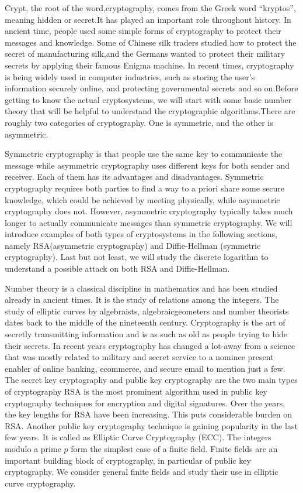\documentclass[a4paper,12pt]{article}
\begin{document}
    Crypt, the root of the word,cryptography, comes from the Greek word “kryptos”, meaning hidden or secret.It has played an important role throughout history. In ancient time, people used some simple forms of cryptography to protect their messages and knowledge. Some of Chinese silk traders studied how to protect the secret of manufacturing silk,and the Germans wanted to protect their military secrets by applying their famous Enigma machine. In recent times, cryptography is being widely used in computer industries, such as storing the user's information securely online, and protecting governmental secrets and so on.Before getting to know the actual cryptosystems, we will start with some basic number theory that will be helpful to understand the cryptographic algorithms.There are roughly two categories of cryptography. One is symmetric, and the other is asymmetric.


    Symmetric cryptography is that people use the same key to communicate the message while asymmetric cryptography uses different keys for both sender and receiver. Each of them has its advantages and disadvantages. Symmetric cryptography requires both parties to find a way to a priori share some secure knowledge, which could be achieved by meeting physically, while asymmetric cryptography does not. However, asymmetric cryptography typically takes much longer to actually communicate messages than symmetric cryptography. We will introduce examples of both types of cryptosystems in the following sections, namely RSA(asymmetric cryptography) and Diffie-Hellman (symmetric cryptography). Last but not least, we will study the discrete logarithm to understand a possible attack on both RSA and Diffie-Hellman.


    Number theory is a classical discipline in mathematics and has been studied already in ancient times. It is the study of relations among the integers. The study of elliptic curves by algebraists, algebraicgeometers and number theorists dates back to the middle of the nineteenth century.
    Cryptography is the art of secretly transmitting information and is as such as old as people trying to hide their secrets. In recent years cryptography has changed a lot-away from a science that was mostly related to military and secret service to a nominee present enabler of online banking, ecommerce, and secure email to mention just a few. The secret key cryptography and public key cryptography are the two main types of cryptography RSA is the most prominent algorithm used in public key cryptography techniques for encryption and digital signatures. Over the years, the key lengths for RSA have been increasing. This puts considerable burden on RSA. Another public key cryptography technique is gaining popularity in the last few years. It is called as Elliptic Curve Cryptography (ECC). The integers modulo a prime $p$ form the simplest case of a finite field. Finite fields are an important building block of cryptography, in particular of public key cryptography. We consider general finite fields and study their use in elliptic curve cryptography.
\end{document}
